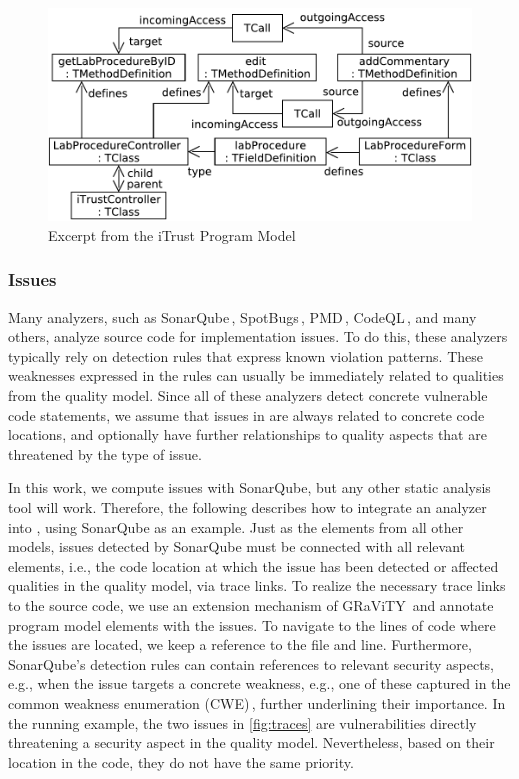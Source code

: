 \begin{figure}
	\centering
	\includegraphics[width=.65\columnwidth]{figures/java-itrust-editLabProcedure}%
	\caption{Excerpt from the iTrust Program Model}
	\label{fig:javaiTrust}
\end{figure}

\subsubsection{Issues}
Many analyzers, such  as SonarQube\,\cite{sonar}, SpotBugs\,\cite{SpotBugs}, PMD\,\cite{pmd}, CodeQL\,\cite{codeql}, and many others, analyze source code for implementation issues.
To do this, these analyzers typically rely on detection rules that express known violation patterns.
These weaknesses expressed in the rules can usually be immediately related to qualities from the quality model.
Since all of these analyzers detect concrete vulnerable code statements, we assume that issues in \appr{} are always related to concrete code locations, and optionally have further relationships to quality aspects that are threatened by the type of issue.

In this work, we compute issues with SonarQube, but any other static analysis tool will work.
Therefore, the following describes how to integrate an analyzer into \appr{}, using SonarQube as an example.
Just as the elements from all other models, issues detected by SonarQube must be connected with all relevant elements, i.e., the code location at which the issue has been detected or affected qualities in the quality model, via trace links.
To realize the necessary trace links to the source code, we use an extension mechanism of GRaViTY\,\cite{peldszus2016continuous} and annotate program model elements with the issues. To navigate to the lines of code where the issues are located, we keep a reference to the file and line.
Furthermore, SonarQube’s detection rules can contain references to relevant security aspects, e.g., when the issue targets a concrete weakness, e.g., one of these captured in the common weakness enumeration (CWE)\,\cite{cwe}, further underlining their importance.
In the running example, the two issues in \autoref{fig:traces} are vulnerabilities directly threatening a security aspect in the quality model. Nevertheless, based on their location in the code, they do not have the same priority.


